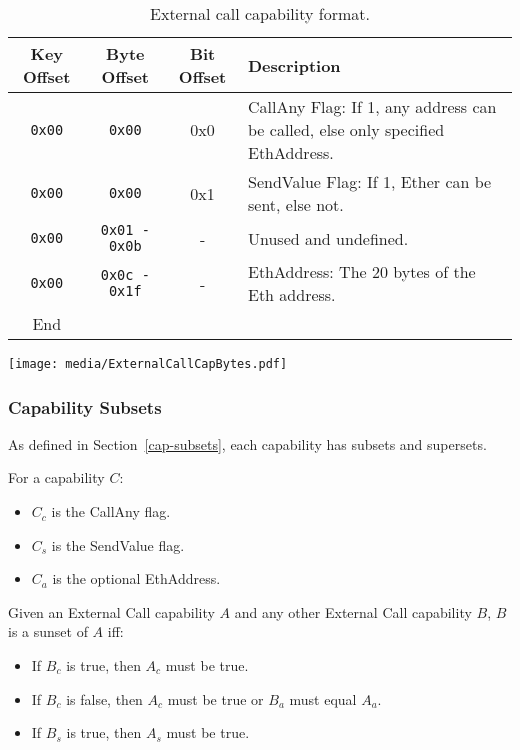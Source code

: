 \documentclass[english,a4paper]{article}
\let\oldparagraph\subsubsection
\renewcommand{\subsubsection}[1]{\oldparagraph{#1}\mbox{}}
\begin{document}
\begin{table}[H]
  \caption{External call capability format.}
  \centering{}%
  \begin{tabularx}{\textwidth}{c|c|c|X}
    \hline
    Key Offset & Byte Offset & Bit Offset & Description \\
    \hline
    \hline
    \texttt{0x00} & \texttt{0x00} & 0x0 & CallAny Flag: If 1, any address can be
      called, else only specified EthAddress. \\
    \texttt{0x00} & \texttt{0x00} & 0x1 & SendValue Flag: If 1, Ether can be
      sent, else not. \\
    \texttt{0x00} & \texttt{0x01 - 0x0b} & - & Unused and undefined. \\
    \texttt{0x00} & \texttt{0x0c - 0x1f} & - & EthAddress: The 20 bytes of the
      Eth address. \\
    \hline
    End & & & \\
    \hline
  \end{tabularx}
\end{table}

\texttt{[image: media/ExternalCallCapBytes.pdf]}

\subsubsection{Capability Subsets}
As defined in Section~\ref{cap-subsets}, each capability has subsets and
supersets.

For a capability $C$:

\begin{itemize}
  \item $C_c$ is the CallAny flag.
  \item $C_s$ is the SendValue flag.
  \item $C_a$ is the optional EthAddress.
\end{itemize}

Given an External Call capability $A$ and any other External Call capability
$B$, $B$ is a sunset of $A$ iff:

\begin{itemize}
  \item If $B_c$ is true, then $A_c$ must be true.
  \item If $B_c$ is false, then $A_c$ must be true or $B_a$ must equal $A_a$.
  \item If $B_s$ is true, then $A_s$ must be true.
\end{itemize}
\end{document}
